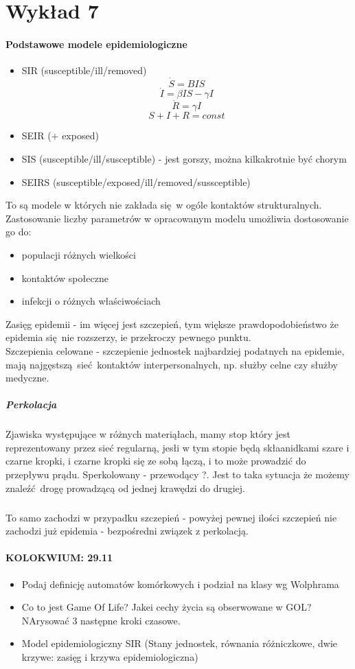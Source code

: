\documentclass{article}
\begin{document}
	\section{Wykład 7}
		\paragraph{Podstawowe modele epidemiologiczne}
		\begin{itemize}
			\item SIR (susceptible/ill/removed) 
			$$\dot{S}=BIS$$
			$$\dot{I}=\beta IS - \gamma I$$
			$$\dot{R} = \gamma I$$
			$$S+I+R = const$$
			\item SEIR (+ exposed)
			\item SIS (susceptible/ill/susceptible) - jest gorszy, można kilkakrotnie być chorym
			\item SEIRS (susceptible/exposed/ill/removed/sussceptible)
		\end{itemize}
		To są modele w których nie zakłada się w ogóle kontaktów strukturalnych.
		Zastosowanie liczby parametrów w opracowanym modelu umożliwia dostosowanie go do:
		\begin{itemize}
			\item populacji różnych wielkości
			\item kontaktów społeczne
			\item infekcji o różnych właściwościach			
		\end{itemize}
		
		Zasięg epidemii - im więcej jest szczepień, tym większe prawdopodobieństwo że epidemia się nie rozszerzy, ie przekroczy pewnego punktu. \\
		Szczepienia celowane - szczepienie jednostek najbardziej podatnych na epidemie,  mają najgęstszą sieć kontaktów interpersonalnych, np. służby celne czy służby medyczne.
		\subparagraph{Perkolacja} Zjawiska występujące w różnych materiąłach, mamy stop który jest reprezentowany przez sieć regularną, jesłi w tym stopie będą skłaanidkami szare i czarne kropki, i czarne kropki się ze sobą łączą, i to może prowadzić do przepływu prądu. Sperkolowany - przewodący ?. Jest to taka sytuacja że możemy znaleźć drogę prowadzącą od jednej krawędzi do drugiej.
		\subparagraph{}To samo zachodzi w przypadku szczepień - powyżej pewnej ilości szczepień nie zachodzi już epidemia - bezpośredni związek z perkolacją.
		\paragraph{KOLOKWIUM: 29.11}
		\begin{itemize}
			\item Podaj definicję automatów komórkowych i podział na klasy wg Wolphrama
			\item Co to jest Game Of Life? Jakei cechy życia są obserwowane w GOL? NArysować 3 następne kroki czasowe.
			\item Model epidemiologiczny SIR (Stany jednostek, równania różniczkowe, dwie krzywe: zasięg i krzywa epidemiologiczna)
		\end{itemize}
			
			
		
		
		 
		 
		 
		 
		 
		 
		 
		
		
		

		
\end{document}
